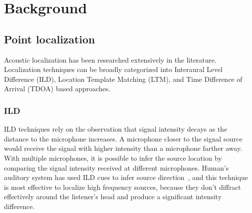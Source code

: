 \chapter{Background}

\section{Point localization}
Acoustic localization has been researched extensively in the literature. Localization techniques can be broadly categorized into Interaural Level Difference (ILD), Location Template Matching (LTM), and Time Difference of Arrival (TDOA) based approaches.

\subsection{ILD}
ILD techniques rely on the observation that signal intensity decays as the distance to the microphone increases. A microphone closer to the signal source would receive the signal with higher intensity than a microphone farther away. With multiple microphones, it is possible to infer the source location by comparing the signal intensity received at different microphones. Human's auditory system has used ILD cues to infer source direction~\cite{ild:2}, and this technique is most effective to localize high frequency sources, because they don't diffract effectively around the listener's head and produce a significant intensity difference.

